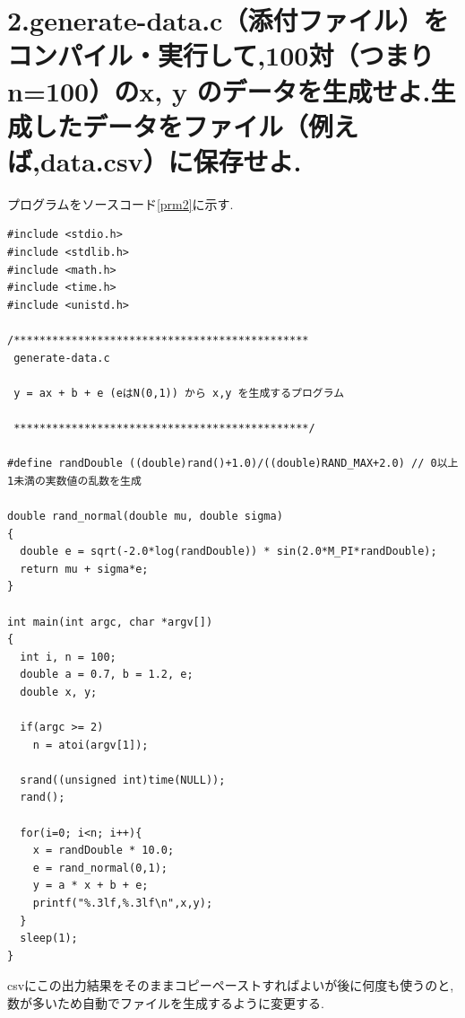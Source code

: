 \documentclass[a4j,10pt,dvipdfmx]{jarticle}
\begin{document}
\section{2.generate-data.c（添付ファイル）をコンパイル・実行して,100対（つまりn=100）のx, y のデータを生成せよ.生成したデータをファイル（例えば,data.csv）に保存せよ.}
プログラムをソースコード\ref{prm2}に示す.
\begin{lstlisting}[label=prm2, caption=generate-data.c]
#include <stdio.h>
#include <stdlib.h>
#include <math.h>
#include <time.h>
#include <unistd.h>

/**********************************************
 generate-data.c
 
 y = ax + b + e (eはN(0,1)) から x,y を生成するプログラム

 **********************************************/

#define randDouble ((double)rand()+1.0)/((double)RAND_MAX+2.0) // 0以上1未満の実数値の乱数を生成

double rand_normal(double mu, double sigma)
{
  double e = sqrt(-2.0*log(randDouble)) * sin(2.0*M_PI*randDouble);
  return mu + sigma*e;
}

int main(int argc, char *argv[])
{
  int i, n = 100;
  double a = 0.7, b = 1.2, e;
  double x, y;

  if(argc >= 2)
    n = atoi(argv[1]);

  srand((unsigned int)time(NULL));
  rand();

  for(i=0; i<n; i++){
    x = randDouble * 10.0;
    e = rand_normal(0,1);
    y = a * x + b + e;
    printf("%.3lf,%.3lf\n",x,y);
  }
  sleep(1);
}
\end{lstlisting}
csvにこの出力結果をそのままコピーペーストすればよいが後に何度も使うのと,数が多いため自動でファイルを生成するように変更する.
\end{document}
